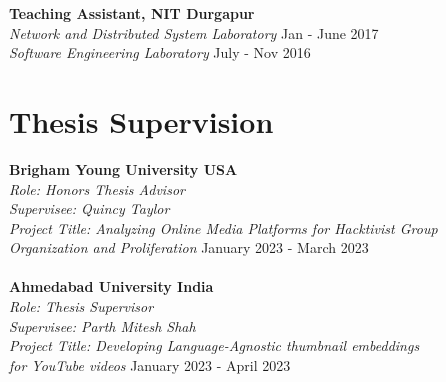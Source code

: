 \documentclass[margin, centered,lmodern]{res}
\begin{document}
\begin{resume}
\textbf{Teaching Assistant, NIT Durgapur} \\
\emph{Network and Distributed System Laboratory} \hfill Jan - June 2017 \\
\emph{Software Engineering Laboratory} \hfill July - Nov 2016

\section{Thesis Supervision}

\textbf{Brigham Young University USA} \\
\emph{Role: Honors Thesis Advisor \\Supervisee: Quincy Taylor \\ Project Title: Analyzing Online Media Platforms for Hacktivist Group \\Organization and Proliferation} \hfill January 2023 -  March 2023 \\ \\
\textbf{Ahmedabad University India} \\ 
\emph{Role: Thesis Supervisor \\ Supervisee: Parth Mitesh Shah \\ Project Title: Developing Language-Agnostic thumbnail embeddings\\for YouTube videos} \hfill January 2023 -  April 2023 \\


\end{resume}
\end{document}
